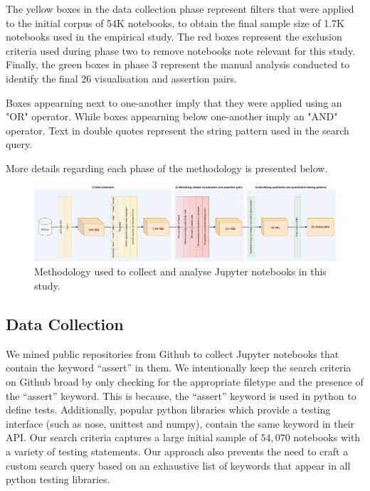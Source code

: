 \documentclass[acmsmall,screen,review,anonymous]{acmart}
\begin{document}
The yellow boxes in the data collection phase represent filters that were applied to the initial corpus of 54K notebooks, to obtain the final sample size of 1.7K notebooks used in the empirical study. The red boxes represent the exclusion criteria used during phase two to remove notebooks note relevant for this study. Finally, the green boxes in phase 3 represent the manual analysis conducted to identify the final 26 visualisation and assertion pairs.

Boxes appearning next to one-another imply that they were applied using an "OR" operator. While boxes appearning below one-another imply an "AND" operator. Text in double quotes represent the string pattern used in the search query.

More details regarding each phase of the methodology is presented below.

\begin{figure}
  \centering
  \includegraphics[width=\textwidth]{method.pdf}
  \caption{Methodology used to collect and analyse Jupyter notebooks
    in this study.}
  \label{fig:method}
\end{figure}

\subsection{Data Collection}\label{sec:data-collect}

We mined public repositories from Github to collect Jupyter notebooks that contain the keyword ``assert'' in them. We intentionally keep the search criteria on Github broad by only checking for the appropriate filetype and the presence of the ``assert'' keyword. This is because, the ``assert'' keyword is used in python to define tests. Additionally, popular python libraries which provide a testing interface (such as nose, unittest and numpy), contain the same keyword in their API. Our search criteria captures a large initial sample of $54,070$ notebooks with a variety of testing statements. Our approach also prevents the need to craft a custom search query based on an exhaustive list of keywords that appear in all python testing libraries.
\end{document}
